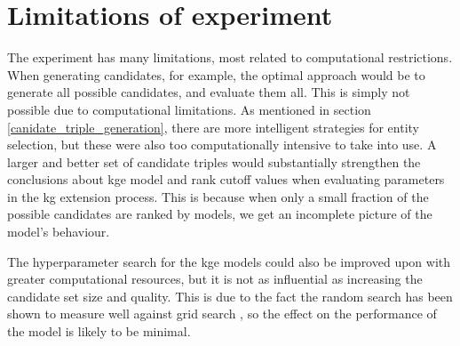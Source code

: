 \section{Limitations of experiment}
\label{experiment_limitations}
The experiment has many limitations, most related to computational restrictions. When generating candidates, for example, the optimal approach would be to generate all possible candidates, and evaluate them all. This is simply not possible due to computational limitations. As mentioned in section \ref{canidate_triple_generation}, there are more intelligent strategies for entity selection, but these were also too computationally intensive to take into use. A larger and better set of candidate triples would substantially strengthen the conclusions about \gls{kge} model and rank cutoff values when evaluating parameters in the \gls{kg} extension process. This is because when only a small fraction of the possible candidates are ranked by models, we get an incomplete picture of the model's behaviour.

The hyperparameter search for the \gls{kge} models could also be improved upon with greater computational resources, but it is not as influential as increasing the candidate set size and quality. This is due to the fact the random search has been shown to measure well against grid search \cite{li2017hyperband}, so the effect on the performance of the model is likely to be minimal.